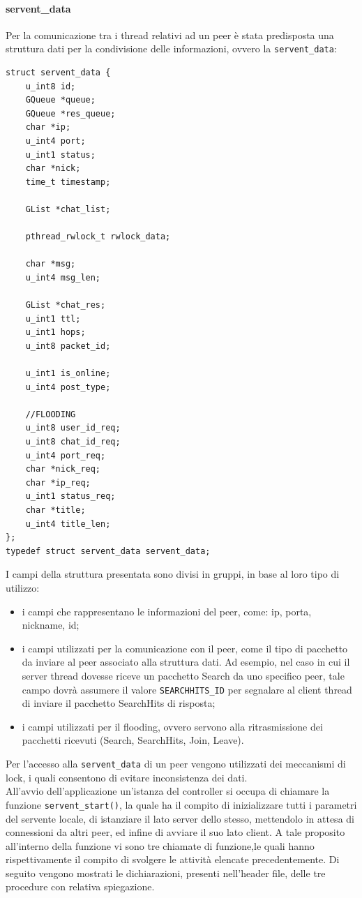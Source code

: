 \paragraph{servent\_data}
Per la comunicazione tra i thread relativi ad un peer è stata predisposta una struttura dati per la condivisione delle informazioni, ovvero la \texttt{servent\_data}:
\begin{lstlisting}[frame=trBL]
struct servent_data {
	u_int8 id;
	GQueue *queue;	
	GQueue *res_queue;
	char *ip;
	u_int4 port;
	u_int1 status;
	char *nick;
	time_t timestamp;
	
	GList *chat_list;

	pthread_rwlock_t rwlock_data;
	
	char *msg;
	u_int4 msg_len;
	
	GList *chat_res;
	u_int1 ttl;
	u_int1 hops;
	u_int8 packet_id;
	
	u_int1 is_online;
	u_int4 post_type;
	
	//FLOODING
	u_int8 user_id_req;
	u_int8 chat_id_req;
	u_int4 port_req;
	char *nick_req;
	char *ip_req;
	u_int1 status_req;
	char *title;
	u_int4 title_len;
};
typedef struct servent_data servent_data;
\end{lstlisting}
I campi della struttura presentata sono divisi in gruppi, in base al loro tipo di utilizzo:
\begin{itemize}
\item i campi che rappresentano le informazioni del peer, come: ip, porta, nickname, id;
\item i campi utilizzati per la comunicazione con il peer, come il tipo di pacchetto da inviare al peer associato alla struttura dati. Ad esempio, nel caso in cui il server thread dovesse riceve un pacchetto Search da uno specifico peer, tale campo dovrà assumere il valore \texttt{SEARCHHITS\_ID} per segnalare al client thread di inviare il pacchetto SearchHits di risposta;
\item i campi utilizzati per il flooding, ovvero servono alla ritrasmissione dei pacchetti ricevuti (Search, SearchHits, Join, Leave).
\end{itemize}
Per l'accesso alla \texttt{servent\_data} di un peer vengono utilizzati dei meccanismi di lock, i quali consentono di evitare inconsistenza dei dati.\\

All'avvio dell'applicazione un'istanza del controller si occupa di chiamare la funzione \texttt{servent\_start()}, la quale ha il compito di inizializzare tutti i parametri del servente locale, di istanziare il lato server dello stesso, mettendolo in attesa di connessioni da altri peer, ed infine di avviare il suo lato client. A tale proposito all'interno della funzione vi sono tre chiamate di funzione,le quali hanno rispettivamente il compito di svolgere le attività elencate precedentemente. Di seguito vengono mostrati le dichiarazioni, presenti nell'header file, delle tre procedure con relativa spiegazione.
